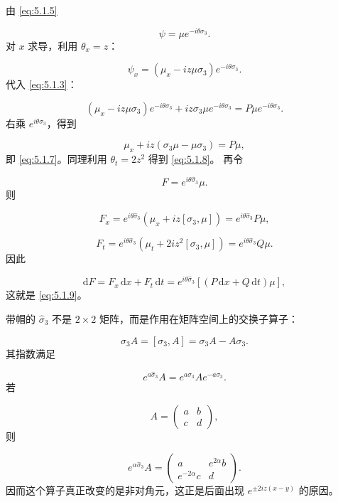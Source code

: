 \documentclass[
    lang=cn,
    scheme=chinese,
    mode=simple,
    device=normal,
    color=blue,
    math=cm,
    thmcnt=section,
    12pt,
    nowatermark
]{elegantbook}
\begin{document}
\begin{callout}
    由 \eqref{eq:5.1.5}

    \[
        \psi=\mu e^{-i\theta\sigma_3}.
    \]
    对 $x$ 求导，利用 $\theta_x=z$：

    \[
        \psi_x
        =
        \left(
        \mu_x-iz\mu\sigma_3
        \right)e^{-i\theta\sigma_3}.
    \]
    代入 \eqref{eq:5.1.3}：

    \[
        \left(
        \mu_x-iz\mu\sigma_3
        \right)e^{-i\theta\sigma_3}
        +
        iz\sigma_3\mu e^{-i\theta\sigma_3}
        =
        P\mu e^{-i\theta\sigma_3}.
    \]
    右乘 $e^{i\theta\sigma_3}$，得到

    \[
        \mu_x+iz(\sigma_3\mu-\mu\sigma_3)=P\mu,
    \]
    即 \eqref{eq:5.1.7}。同理利用 $\theta_t=2z^2$ 得到 \eqref{eq:5.1.8}。
    再令

    \[
        F=e^{i\theta\widehat{\sigma}_3}\mu.
    \]
    则

    \[
        F_x
        =
        e^{i\theta\widehat{\sigma}_3}
        \left(
        \mu_x+iz[\sigma_3,\mu]
        \right)
        =
        e^{i\theta\widehat{\sigma}_3}P\mu,
    \]

    \[
        F_t
        =
        e^{i\theta\widehat{\sigma}_3}
        \left(
        \mu_t+2iz^2[\sigma_3,\mu]
        \right)
        =
        e^{i\theta\widehat{\sigma}_3}Q\mu.
    \]
    因此

    \[
        \mathrm dF
        =
        F_x\,\mathrm dx+F_t\,\mathrm dt
        =
        e^{i\theta\widehat{\sigma}_3}
        \left[(P\,\mathrm dx+Q\,\mathrm dt)\mu\right],
    \]
    这就是 \eqref{eq:5.1.9}。
\end{callout}

\begin{callout}
    带帽的 $\widehat{\sigma}_3$ 不是 $2\times2$ 矩阵，而是作用在矩阵空间上的交换子算子：

    \[
        \widehat{\sigma}_3A=[\sigma_3,A]=\sigma_3A-A\sigma_3.
    \]
    其指数满足

    \[
        e^{a\widehat{\sigma}_3}A
        =
        e^{a\sigma_3}Ae^{-a\sigma_3}.
    \]
    若

    \[
        A=\begin{pmatrix}a&b\\c&d\end{pmatrix},
    \]
    则

    \[
        e^{\alpha\widehat{\sigma}_3}A
        =
        \begin{pmatrix}
            a             & e^{2\alpha}b \\
            e^{-2\alpha}c & d
        \end{pmatrix}.
    \]
    因而这个算子真正改变的是非对角元，这正是后面出现 $e^{\pm2iz(x-y)}$ 的原因。
\end{callout}
\end{document}

